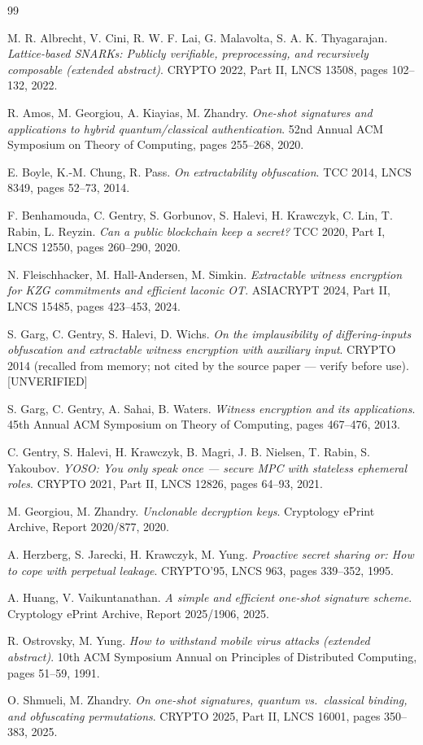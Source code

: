 \documentclass{conjura-conjecture}
\begin{document}
\begin{conjurabibliography}{99}

M. R. Albrecht, V. Cini, R. W. F. Lai, G. Malavolta,
S. A. K. Thyagarajan.
\emph{Lattice-based SNARKs: Publicly verifiable, preprocessing, and
recursively composable (extended abstract)}.
CRYPTO 2022, Part II, LNCS 13508, pages 102--132, 2022.

R. Amos, M. Georgiou, A. Kiayias, M. Zhandry.
\emph{One-shot signatures and applications to hybrid
quantum/classical authentication}.
52nd Annual ACM Symposium on Theory of Computing, pages 255--268,
2020.

E. Boyle, K.-M. Chung, R. Pass.
\emph{On extractability obfuscation}.
TCC 2014, LNCS 8349, pages 52--73, 2014.

F. Benhamouda, C. Gentry, S. Gorbunov, S. Halevi, H. Krawczyk,
C. Lin, T. Rabin, L. Reyzin.
\emph{Can a public blockchain keep a secret?}
TCC 2020, Part I, LNCS 12550, pages 260--290, 2020.

N. Fleischhacker, M. Hall-Andersen, M. Simkin.
\emph{Extractable witness encryption for KZG commitments and efficient
laconic OT}.
ASIACRYPT 2024, Part II, LNCS 15485, pages 423--453, 2024.

S. Garg, C. Gentry, S. Halevi, D. Wichs.
\emph{On the implausibility of differing-inputs obfuscation and
extractable witness encryption with auxiliary input}.
CRYPTO 2014 (recalled from memory; not cited by the source paper ---
verify before use). [UNVERIFIED]

S. Garg, C. Gentry, A. Sahai, B. Waters.
\emph{Witness encryption and its applications}.
45th Annual ACM Symposium on Theory of Computing, pages 467--476,
2013.

C. Gentry, S. Halevi, H. Krawczyk, B. Magri, J. B. Nielsen, T. Rabin,
S. Yakoubov.
\emph{YOSO: You only speak once --- secure MPC with stateless
ephemeral roles}.
CRYPTO 2021, Part II, LNCS 12826, pages 64--93, 2021.

M. Georgiou, M. Zhandry.
\emph{Unclonable decryption keys}.
Cryptology ePrint Archive, Report 2020/877, 2020.

A. Herzberg, S. Jarecki, H. Krawczyk, M. Yung.
\emph{Proactive secret sharing or: How to cope with perpetual
leakage}.
CRYPTO'95, LNCS 963, pages 339--352, 1995.

A. Huang, V. Vaikuntanathan.
\emph{A simple and efficient one-shot signature scheme}.
Cryptology ePrint Archive, Report 2025/1906, 2025.

R. Ostrovsky, M. Yung.
\emph{How to withstand mobile virus attacks (extended abstract)}.
10th ACM Symposium Annual on Principles of Distributed Computing,
pages 51--59, 1991.

O. Shmueli, M. Zhandry.
\emph{On one-shot signatures, quantum vs.\ classical binding, and
obfuscating permutations}.
CRYPTO 2025, Part II, LNCS 16001, pages 350--383, 2025.

\end{conjurabibliography}
\end{document}

